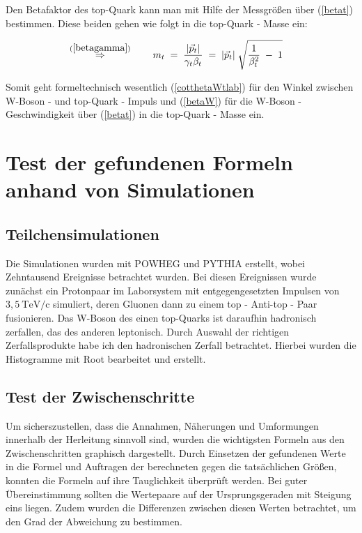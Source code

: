 \documentclass[
a4paper,                                %
twoside,                                %
BCOR1.4cm,                      %
ngerman,                                %
10pt,                           %
headings=normal,                %
headsepline,                    %
clearplainpage, %
final,                                  %
div=14,
parskip=full
]{scrbook}
\begin{document}
Den Betafaktor des top-Quark kann man mit Hilfe der Messgr\"o\ss en \"uber (\ref{betat}) bestimmen. Diese beiden gehen wie folgt in die top-Quark - Masse ein:

\begin{align}
\stackrel{\mathrm{(\ref{betagamma})}}\Rightarrow\qquad
	m_{t}
\;&=\;
	\dfrac{|\vec{p}_{t}|}{\gamma_{t} \beta_{t}}
\;=\;
	|\vec{p}_{t}|\;\sqrt{\dfrac{1}{\beta_{t}^{2}}\;-\;1}
\label{topmasse}
\end{align}

Somit geht formeltechnisch wesentlich (\ref{cotthetaWtlab}) f\"ur den Winkel zwischen W-Boson - und top-Quark - Impuls und (\ref{betaW}) f\"ur die W-Boson - Geschwindigkeit \"uber (\ref{betat}) in die top-Quark - Masse ein.

\newpage

\chapter{Test der gefundenen Formeln anhand von Simulationen}

\section{Teilchensimulationen}

Die Simulationen wurden mit POWHEG und PYTHIA erstellt, wobei Zehntausend Ereignisse betrachtet wurden. Bei diesen Ereignissen wurde zun\"achst ein Protonpaar im Laborsystem mit entgegengesetzten Impulsen von $ 3,5\ \text{TeV}\text{/c} $ simuliert, deren Gluonen dann zu einem top - Anti-top - Paar fusionieren. Das W-Boson des einen top-Quarks ist daraufhin hadronisch zerfallen, das des anderen leptonisch.  Durch Auswahl der richtigen Zerfallsprodukte habe ich den hadronischen Zerfall betrachtet. Hierbei wurden die Histogramme mit Root bearbeitet und erstellt. \cite{pythiamanual}

\section{Test der Zwischenschritte}

Um sicherszustellen, dass die Annahmen, N\"aherungen und Umformungen innerhalb der Herleitung sinnvoll sind, wurden die wichtigsten Formeln aus den Zwischenschritten graphisch dargestellt. Durch Einsetzen der gefundenen Werte in die Formel und Auftragen der berechneten gegen die tats\"achlichen Gr\"o\ss en, konnten die Formeln auf ihre Tauglichkeit \"uberpr\"uft werden. Bei guter \"Ubereinstimmung sollten die Wertepaare auf der Ursprungsgeraden mit Steigung eins liegen. Zudem wurden die Differenzen zwischen diesen Werten betrachtet, um den Grad der Abweichung zu bestimmen.
\end{document}
